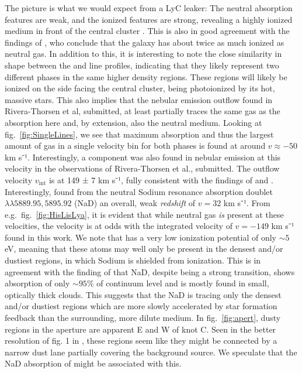 \documentclass[twocolumn,]{aastex61}
\begin{document}
The picture is what we would expect from a LyC leaker: The neutral absorption
features are weak, and the ionized features are strong, revealing a   highly
ionized medium in front of the central cluster . This is also in good agreement
with the findings of \citet{Pardy2016arXiv}, who conclude that the galaxy has
about twice as much ionized as neutral gas. In addition to this, it is
interesting to note the close similarity in shape between the  and
 line profiles, indicating that they likely represent two different
phases in the same higher density regions. These regions will likely be ionized
on the side facing the central cluster, being photoionized by its hot, massive
stars. This also implies that the nebular emission outflow found in
Rivera-Thorsen et al, submitted, at least partially traces the same gas as the
 absorption here and, by extension, also the neutral medium. Looking
at fig.~\ref{fig:SingleLines}, we see that maximum absorption and thus the
largest amount of gas in a single velocity bin for both phases is found at
around $v \approx -50$ km s⁻¹. Interestingly, a component was also found in
nebular emission at this velocity in the observations of Rivera-Thorsen et al.,
submitted. The outflow velocity $v_{\text{int}}$ is at 149 ± 7 km s⁻¹, fully
consistent with the findings of \citet{Heckman2015} and \citet{Alexandroff2015}.
Interestingly, \citet{Sandberg2013} found from the neutral Sodium resonance
absorption doublet $\lambda \lambda 5889.95,5895.92$ (NaD) an overall, weak
\emph{redshift} of $v = 32$ km s⁻¹. From e.g.~fig.~\ref{fig:HisLisLya}, it is
evident that while neutral gas \emph{is} present at these velocities, the
velocity is at odds with the integrated velocity of $v = -149$ km s⁻¹ found in
this work. We note that  has a very low ionization potential of only
$\sim 5$ eV, meaning that these atoms may well only be present in the densest
and/or dustiest regions, in which Sodium is shielded from ionization.  This is
in agreement with the finding of \citet{Sandberg2013} that NaD, despite being a
strong transition, shows absorption of only $\sim 95\%$ of continuum level and
is mostly found in small, optically thick clouds.  This suggests that the NaD is
tracing only the densest and/or dustiest regions which are more slowly
accelerated by star formation feedback than the surrounding, more dilute medium.
In fig.~\ref{fig:apert}, dusty regions in the aperture are apparent E and W of
knot C. Seen in the better resolution of fig. 1 in \citet{Adamo2010}, these
regions seem like they might be connected by a narrow dust lane partially
covering the background source. We speculate that the NaD absorption of
\citet{Sandberg2013} might be associated with this.
\end{document}
